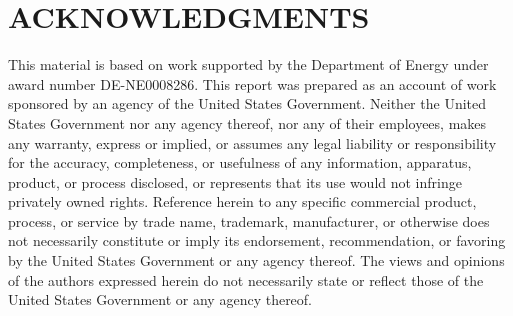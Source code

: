 \documentclass[12pt]{article}
\begin{document}
%



%
\section*{ACKNOWLEDGMENTS}

This material is based on work supported by the Department of Energy under award number DE-NE0008286. This report was prepared as an account of work sponsored by an agency of the United States Government. Neither the United States Government nor any agency thereof, nor any of their employees, makes any warranty, express or implied, or assumes any legal liability or responsibility for the accuracy, completeness, or usefulness of any information, apparatus, product, or process disclosed, or represents that its use would not infringe privately owned rights. Reference herein to any specific commercial product, process, or service by trade name, trademark, manufacturer, or otherwise does not necessarily constitute or imply its endorsement, recommendation, or favoring by the United States Government or any agency thereof. The views and opinions of the authors expressed herein do not necessarily state or reflect those of the United States Government or any agency thereof.
\end{document}
